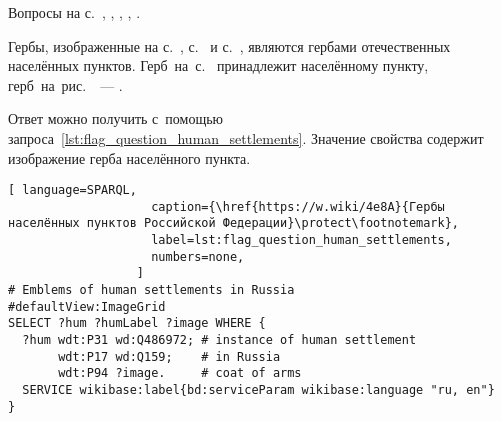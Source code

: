 \begin{task}
\label{answer:flag_human_settlements}
    \AnswerBackref
    Вопросы на с.~\pageref{fig:flag_question_human_settlements1}, \pageref{fig:flag_question_human_settlements2}, \pageref{fig:flag_question_human_settlements3}, \pageref{fig:flag_question_human_settlements4}, \pageref{fig:flag_question_human_settlements5}.

Гербы, изображенные на с.~\pageref{fig:flag_question_human_settlements1}, 
    с.~\pageref{fig:flag_question_human_settlements2} и 
    с.~\pageref{fig:flag_question_human_settlements5}, 
    являются гербами отечественных населённых пунктов. 
    Герб~на~с.~\pageref{fig:flag_question_human_settlements3} 
    принадлежит  населённому пункту, 
    герб~на~рис.~\pageref{fig:flag_question_human_settlements4}~--- 
    . 

Ответ можно получить с~помощью запроса~\ref{lst:flag_question_human_settlements}. 
    Значение свойства  
    содержит изображение герба населённого пункта.

\newpage
{}
\begin{lstlisting}[ language=SPARQL, 
                    caption={\href{https://w.wiki/4e8A}{Гербы населённых пунктов Российской Федерации}\protect\footnotemark},
                    label=lst:flag_question_human_settlements,
                    numbers=none,
                  ]
# Emblems of human settlements in Russia
#defaultView:ImageGrid
SELECT ?hum ?humLabel ?image WHERE {
  ?hum wdt:P31 wd:Q486972; # instance of human settlement
       wdt:P17 wd:Q159;    # in Russia
       wdt:P94 ?image.     # coat of arms
  SERVICE wikibase:label{bd:serviceParam wikibase:language "ru, en"}
}
\end{lstlisting}
\end{task}




